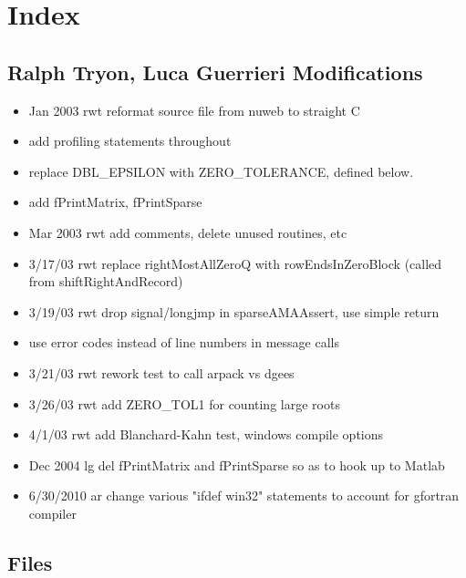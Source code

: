 \documentclass[12pt]{article}
\begin{document}
\begin{flushleft}
\begin{minipage}{\linewidth}
\begin{list}{}{\setlength{\itemsep}{-\parsep}\setlength{\itemindent}{-\leftmargin}}
\item{}
\end{list}
\end{minipage}\vspace{4ex}
\end{flushleft}
\appendix

\section{Index}
\label{sec:index}

\subsection{Ralph Tryon, Luca Guerrieri Modifications}
\label{sec:ralph-tryon-modif}

\begin{itemize}
\item  Jan 2003 	rwt reformat source file from nuweb to straight C
\item  add profiling statements throughout
\item replace DBL\_EPSILON with ZERO\_TOLERANCE, defined below.
\item   add fPrintMatrix, fPrintSparse      
\item  Mar 2003 	rwt add comments, delete unused routines, etc 
\item  3/17/03		rwt replace rightMostAllZeroQ with rowEndsInZeroBlock               (called from shiftRightAndRecord) 
\item  3/19/03     rwt drop signal/longjmp in sparseAMAAssert, use simple return  
\item  use error codes instead of line numbers in message calls   
\item  3/21/03		rwt rework test to call arpack vs dgees    
\item  3/26/03     rwt add ZERO\_TOL1 for counting large roots      
\item  4/1/03	 rwt add Blanchard-Kahn test, windows compile options  
\item  Dec 2004	lg	del fPrintMatrix and fPrintSparse so as to hook up to Matlab
\item  6/30/2010	ar 	change various "ifdef win32" statements to account for gfortran compiler 
\end{itemize}

\subsection{Files}
\label{sec:files}
\end{document}

